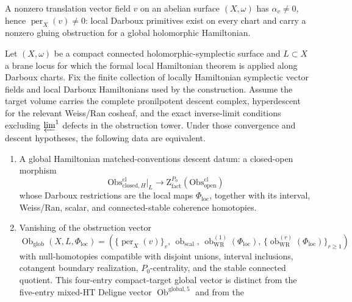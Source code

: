 \begin{ex}
  A nonzero translation vector field \(v\) on an abelian surface
  \((X,\omega)\) has \(\alpha_v\neq0\), hence
  \(\operatorname{per}_X(v)\neq0\): local Darboux primitives exist on
  every chart and carry a nonzero gluing obstruction for a global
  holomorphic Hamiltonian.
\end{ex}

\begin{thm}\label{thm:global-descent-criterion}
  Let \((X,\omega)\) be a compact connected holomorphic-symplectic
  surface and \(L\subset X\) a brane locus for which the formal local
  Hamiltonian theorem is applied along Darboux charts.  Fix the finite
  collection of locally Hamiltonian symplectic vector fields and local
  Darboux Hamiltonians used by the construction.  Assume the target
  volume carries the complete pronilpotent descent complex, hyperdescent
  for the relevant Weiss/Ran cosheaf, and the exact inverse-limit
  conditions excluding \(\varprojlim^1\) defects in the obstruction
  tower.  Under those convergence and descent hypotheses, the
  following data are equivalent.
  \begin{enumerate}[label=(\roman*)]
    \item A global Hamiltonian matched-conventions descent datum:
      a closed-open morphism
      \[
        \mathrm{Obs}^{\mathrm{cl}}_{\mathrm{closed},H}\big|_L
          \longrightarrow
        \mathrm Z^{P_0}_{\mathrm{fact}}
          (\mathrm{Obs}^{\mathrm{cl}}_{\mathrm{open}})
      \]
      whose Darboux restrictions are the local maps
      \(\Phi_{\mathrm{loc}}\), together with its interval,
      Weiss/Ran, scalar, and connected-stable coherence homotopies.
    \item Vanishing of the obstruction vector
      \[
      \operatorname{Ob}_{\mathrm{glob}}(X,L,\Phi_{\mathrm{loc}})
      =
      \left(
        \{\operatorname{per}_X(v)\}_v,\,
        \operatorname{ob}_{\mathrm{scal}},\,
        \operatorname{ob}^{(1)}_{\mathrm{WR}}(\Phi_{\mathrm{loc}}),\,
        \{\operatorname{ob}^{(r)}_{\mathrm{WR}}(\Phi_{\mathrm{loc}})\}_{r\ge1}
      \right)
      \]
      with null-homotopies compatible with disjoint unions, interval
      inclusions, cotangent boundary realization, \(P_0\)-centrality, and
      the stable connected quotient.  This four-entry compact-target
      global vector is distinct from the five-entry mixed-HT Deligne
      vector \(\operatorname{Ob}^{\mathrm{global},5}\) and from the

\end{enumerate}
\end{thm}
